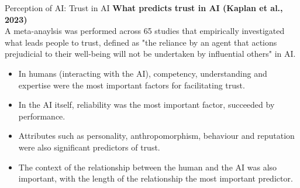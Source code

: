 \documentclass[8pt]{beamer}
\begin{document}
	\begin{frame}[t]{Perception of AI: Trust in AI}
		\textbf{What predicts trust in AI (Kaplan et al., 2023)}\\
		A meta-anaylsis was performed across 65 studies that empirically investigated what leads people to trust, defined as "the reliance by an agent that actions prejudicial to their well-being will not be undertaken by influential others" in AI.
		\begin{itemize}
			\item In humans (interacting with the AI), competency, understanding and expertise were the most important factors for facilitating trust.
			\item In the AI itself, reliability was the most important factor, succeeded by performance.
			\item Attributes such as personality, anthropomorphism, behaviour and reputation were also significant predictors of trust.
			\item The context of the relationship between the human and the AI was also important, with the length of the relationship the most important predictor.
		\end{itemize}
		\centering
		\vspace{2.17cm}
	\end{frame}
\end{document}
